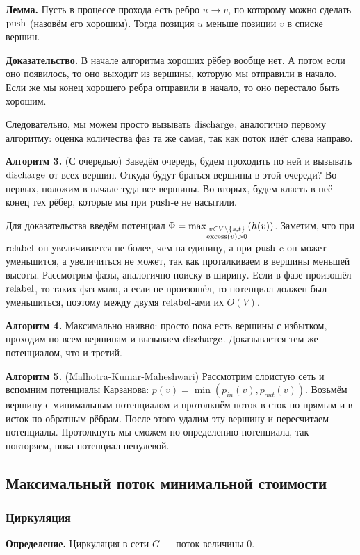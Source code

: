 \textbf{Лемма.} Пусть в процессе прохода есть ребро $u \to v$, по которому можно сделать $\operatorname{push}$ (назовём его хорошим).
Тогда позиция $u$ меньше позиции $v$ в списке вершин.

\textbf{Доказательство.} В начале алгоритма хороших рёбер вообще нет. А потом если оно появилось, то оно выходит из вершины, которую мы отправили в начало.
Если же мы конец хорошего ребра отправили в начало, то оно перестало быть хорошим.

Следовательно, мы можем просто вызывать $\operatorname{discharge}$, аналогично первому алгоритму: оценка количества фаз та же самая, так как поток идёт слева направо.

\textbf{Алгоритм 3.} (С очередью) Заведём очередь, будем проходить по ней и вызывать $\operatorname{discharge}$ от всех вершин.
Откуда будут браться вершины в этой очереди? 
Во-первых, положим в начале туда все вершины.
Во-вторых, будем класть в неё конец тех рёбер, которые мы при $\operatorname{push}$-е не насытили.

Для доказательства введём потенциал $\Phi = \max_{\substack{v \in V \setminus \{s, t\} \\ \operatorname{excess}(v) > 0}}(h(v))$.
Заметим, что при $\operatorname{relabel}$ он увеличивается не более, чем на единицу, а при $\operatorname{push}$-e он может уменьшится, а увеличиться не может, так как проталкиваем в вершины меньшей высоты.
Рассмотрим фазы, аналогично поиску в ширину. Если в фазе произошёл $\operatorname{relabel}$, то таких фаз мало, а если не произошёл, то потенциал должен был уменьшиться, поэтому между двумя $\operatorname{relabel}$-ами их $O(V)$.

\textbf{Алгоритм 4.} Максимально наивно: просто пока есть вершины с избытком, проходим по всем вершинам и вызываем $\operatorname{discharge}$.
Доказывается тем же потенциалом, что и третий.

\textbf{Алгоритм 5.} (Malhotra-Kumar-Maheshwari) Рассмотрим слоистую сеть и вспомним потенциалы Карзанова: $p(v) = \min(p_{in}(v), p_{out}(v))$.
Возьмём вершину с минимальным потенциалом и протолкнём поток в сток по прямым и в исток по обратным рёбрам.
После этого удалим эту вершину и пересчитаем потенциалы.
Протолкнуть мы сможем по определению потенциала, так повторяем, пока потенциал ненулевой.

\subsection{Максимальный поток минимальной стоимости}
\subsubsection{Циркуляция}
\textbf{Определение.} Циркуляция в сети $G$ --- поток величины 0.

